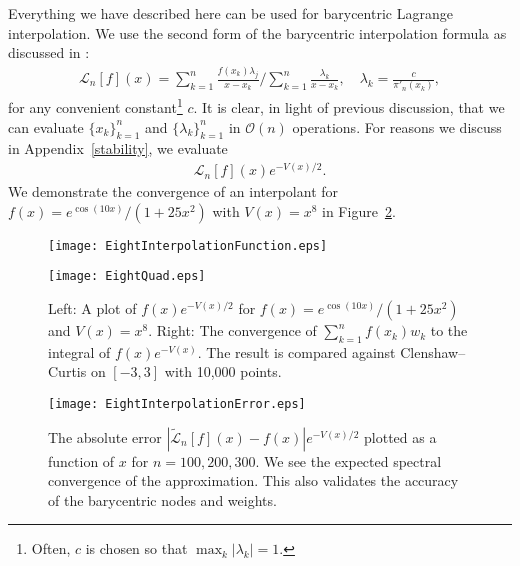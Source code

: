 \documentclass[final]{siamltex}
\begin{document}
Everything we have described here can be used for barycentric Lagrange interpolation.  We use the second form of the barycentric interpolation formula as discussed in \cite{BerrutTrefethen}:
\begin{align}\label{bc-form}
\mathcal L_n[f](x) = \sum_{k=1}^n \frac{f(x_{k}) \lambda_j}{x- x_{k}} / \sum_{k=1}^n \frac{\lambda_k}{x- x_k} , \quad \lambda_k = \frac{c}{\pi'_n(x_{k})},
\end{align}
for any convenient constant\footnote{Often, $c$ is chosen so that $\max_k |\lambda_k|=1$.} $c$. It is clear, in light of previous discussion, that we can evaluate $\{x_{k}\}_{k=1}^n$ and $\{\lambda_k\}_{k=1}^n$ in ${\mathcal O}(n)$ operations.   For reasons we discuss in Appendix~\ref{stability}, we evaluate
\begin{align}\label{weighted-bc}
\mathcal L_n[f](x)e^{-V(x)/2}. 
\end{align}
We demonstrate the convergence of an interpolant for $f(x) = e^{\cos(10x)}/(1+25x^2)$ with $V(x) = x^8$ in Figure~\ref{EightInterpolationError2}.

\begin{figure}[tbp]
\centering
\begin{minipage}{.49\textwidth}
 \texttt{[image: EightInterpolationFunction.eps]}
\end{minipage}
\begin{minipage}{.49\textwidth}

\vspace{-.3cm}

\texttt{[image: EightQuad.eps]}
 \end{minipage}
\caption{Left: A plot of $f(x)e^{-V(x)/2}$ for $f(x) = e^{\cos(10x)}/(1+25x^2)$ and $V(x) = x^8$. Right: The convergence 
of $\sum_{k=1}^n f(x_{k}) w_k$ to the integral of $f(x) e^{-V(x)}$.  The result is compared against Clenshaw--Curtis 
on $[-3,3]$ with 10,000 points. \label{EightInterpolationError1}}
\end{figure}

\begin{figure}[tbp]
\centering
\texttt{[image: EightInterpolationError.eps]}
\caption{The absolute error $|\tilde{\mathcal L}_n[f](x) - f(x)|e^{-V(x)/2}$ plotted as 
a function of $x$ for $n = 100, 200, 300$.  We see the expected spectral convergence of the approximation.  
This also validates the accuracy of the barycentric nodes and weights.\label{EightInterpolationError2}}
\end{figure}
\end{document}

